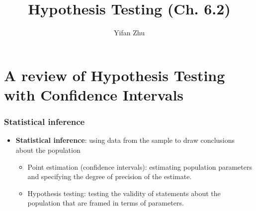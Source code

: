 \documentclass[handout]{beamer}\usepackage[]{graphicx}\usepackage[]{color}
\title{Hypothesis Testing (Ch. 6.2)}
\author{Yifan Zhu}
\date{}
\institute{Iowa State University}
\numberwithin{equation}{section}
\begin{document}
\begin{frame}
\titlepage
 \end{frame}
 

\section{A review of Hypothesis Testing with Confidence Intervals}

\begin{frame}
\frametitle{Statistical inference}
\begin{itemize}
\item {\bf Statistical inference}: using data from the sample to draw conclusions about the population 
\begin{itemize}
\pause \item Point estimation (confidence intervals): estimating population parameters and specifying the degree of precision of the estimate.
\pause \item Hypothesis testing: testing the validity of statements about the population that are framed in terms of parameters. 
\end{itemize}
\end{itemize}
\end{frame}
\end{document}
